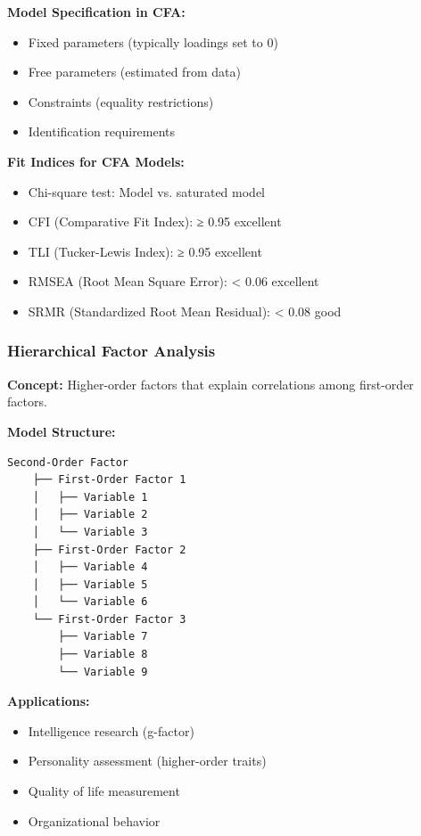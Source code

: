 \documentclass[
]{article}
\begin{document}
\textbf{Model Specification in CFA:}

\begin{itemize}
\item
  Fixed parameters (typically loadings set to 0)
\item
  Free parameters (estimated from data)
\item
  Constraints (equality restrictions)
\item
  Identification requirements
\end{itemize}

\textbf{Fit Indices for CFA Models:}

\begin{itemize}
\item
  Chi-square test: Model vs. saturated model
\item
  CFI (Comparative Fit Index): ≥ 0.95 excellent
\item
  TLI (Tucker-Lewis Index): ≥ 0.95 excellent
\item
  RMSEA (Root Mean Square Error): \textless{} 0.06 excellent
\item
  SRMR (Standardized Root Mean Residual): \textless{} 0.08 good
\end{itemize}

\subsubsection{Hierarchical Factor Analysis}

\textbf{Concept:} Higher-order factors that explain correlations among
first-order factors.

\textbf{Model Structure:}

\begin{verbatim}
Second-Order Factor
    ├── First-Order Factor 1
    │   ├── Variable 1
    │   ├── Variable 2
    │   └── Variable 3
    ├── First-Order Factor 2
    │   ├── Variable 4
    │   ├── Variable 5
    │   └── Variable 6
    └── First-Order Factor 3
        ├── Variable 7
        ├── Variable 8
        └── Variable 9
\end{verbatim}

\textbf{Applications:}

\begin{itemize}
\item
  Intelligence research (g-factor)
\item
  Personality assessment (higher-order traits)
\item
  Quality of life measurement
\item
  Organizational behavior
\end{itemize}
\end{document}
